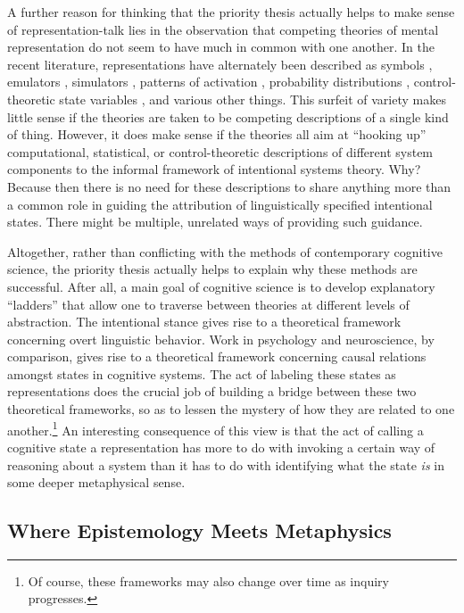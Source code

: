 A further reason for thinking that the priority thesis actually helps to make sense of representation-talk lies in the observation that competing theories of mental representation do not seem to have much in common with one another. In the recent literature, representations have alternately been described as symbols \citep{Fodor:1998}, emulators \citep{Grush:2004}, simulators \citep{Barsalou:1999}, patterns of activation \citep{McClelland:2010}, probability distributions \citep{Goodman:2015}, control-theoretic state variables \citep{Eliasmith:2003,Eliasmith:2013}, and various other things. This surfeit of variety makes little sense if the theories are taken to be competing descriptions of a single kind of thing. However, it does make sense if the theories all aim at ``hooking up'' computational, statistical, or control-theoretic descriptions of different system components to the informal framework of intentional systems theory. Why? Because then there is no need for these descriptions to share anything more than a common role in guiding the attribution of linguistically specified intentional states. There might be multiple, unrelated ways of providing such guidance.

Altogether, rather than conflicting with the methods of contemporary cognitive science, the priority thesis actually helps to explain why these methods are successful. After all, a main goal of cognitive science is to develop explanatory ``ladders'' that allow one to traverse between theories at different levels of abstraction. The intentional stance gives rise to a theoretical framework concerning overt linguistic behavior. Work in psychology and neuroscience, by comparison, gives rise to a theoretical framework concerning causal relations amongst states in cognitive systems. The act of labeling these states as representations does the crucial job of building a bridge between these two theoretical frameworks, so as to lessen the mystery of how they are related to one another.\footnote{Of course, these frameworks may also change over time as inquiry progresses.} An interesting consequence of this view is that the act of calling a cognitive state a representation has more to do with invoking a certain way of reasoning about a system than it has to do with identifying what the state \textit{is} in some deeper metaphysical sense.

\subsection{Where Epistemology Meets Metaphysics}

